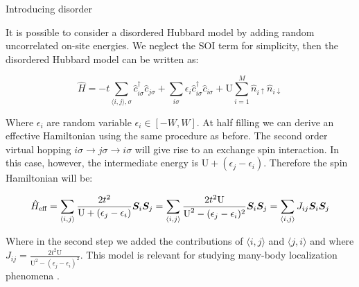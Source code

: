 \begin{subsection}{Introducing disorder}

It is possible to consider a disordered Hubbard model by adding random uncorrelated on-site energies. We neglect the SOI term for simplicity, then the disordered Hubbard model can be written as:

\begin{equation}
\label{DisorderedHubbardModel}
\hat{H} = -t\sum_{\langle i,j \rangle, \sigma} \hat{c}_{i \sigma}^\dagger \hat{c}_{j \sigma} +
\sum_{i \sigma} \epsilon_i \hat{c}_{i \sigma}^\dagger \hat{c}_{i \sigma} + \text{U} \sum_{i=1}^M \hat{n}_{i\uparrow}\hat{n}_{i\downarrow}
\end{equation}

Where $\epsilon_i$ are random variable $\epsilon_i \in [-W,W]$. At half filling we can derive an effective Hamiltonian using the same procedure as before. The second order virtual hopping $i\sigma \rightarrow j\sigma \rightarrow i\sigma$ will give rise to an exchange spin interaction. In this case, however, the intermediate energy is $\text{U} + (\epsilon_j - \epsilon_i)$. Therefore the spin Hamiltonian will be:

\begin{equation}
\hat{H}_{\text{eff}} = \sum_{\langle i,j \rangle} \frac{2t^2}{\text{U} + (\epsilon_j - \epsilon_i)} \boldsymbol{S}_i\boldsymbol{S}_j = \sum_{\langle i,j \rangle} \frac{2t^2\text{U}}{\text{U}^2-(\epsilon_j-\epsilon_i)^2} \boldsymbol{S}_i\boldsymbol{S}_j = \sum_{\langle i,j \rangle} J_{ij} \boldsymbol{S}_i\boldsymbol{S}_j
\end{equation}

Where in the second step we added the contributions of $\langle i,j \rangle$ and $\langle j,i \rangle$ and where $J_{ij} = \frac{2t^2\text{U}}{\text{U}^2-(\epsilon_j-\epsilon_i)^2}$. This model is relevant for studying many-body localization phenomena \cite{Protopopov}.

\end{subsection}

